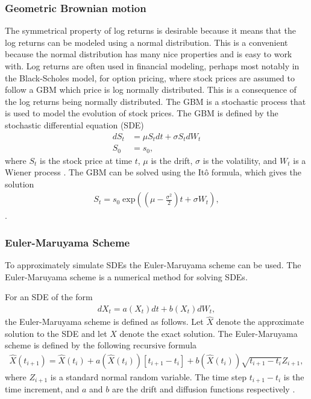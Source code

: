 \subsubsection{Geometric Brownian motion}
The symmetrical property of log returns is desirable because it means that the log returns can be modeled using a normal distribution. This is a convenient because the normal distribution has many nice properties and is easy to work with. Log returns are often used in financial modeling, perhaps most notably in the Black-Scholes model, for option pricing, where stock prices are assumed to follow a \gls{GBM} which price is log normally distributed. This is a consequence of the log returns being normally distributed. The \gls{GBM} is a stochastic process that is used to model the evolution of stock prices. The \gls{GBM} is defined by the stochastic differential equation (SDE)
\begin{align*}
    dS_t &= \mu S_t dt + \sigma S_t dW_t \\
    S_0 &= s_0, 
\end{align*}
where $S_t$ is the stock price at time $t$, $\mu$ is the drift, $\sigma$ is the volatility, and $W_t$ is a Wiener process  . The \gls{GBM} can be solved using the Itô formula, which gives the solution
\begin{align*}
    S_t = s_0 \;\mathrm{exp}\left( \left( \mu - \frac{\sigma^2}{2} \right)t + \sigma W_t \right),
\end{align*}
.

\subsubsection{Euler-Maruyama Scheme}\label{sec:EulerMaruyama}
To approximately simulate \gls{SDE}s the Euler-Maruyama scheme can be used. The Euler-Maruyama scheme is a numerical method for solving \gls{SDE}s. 

For an \gls{SDE} of the form
\begin{align*}
    dX_t = a(X_t)dt + b(X_t)dW_t,
\end{align*}
the Euler-Maruyama scheme is defined as follows. 
Let $\hat{X}$ denote the approximate solution to the \gls{SDE} and let $X$ denote the exact solution. The Euler-Maruyama scheme is defined by the following recursive formula 
\begin{align*}
    \hat{X}(t_{i+1}) = \hat{X}(t_i) + a(\hat{X}(t_i))[t_{i+1}-t_i]  + b(\hat{X}(t_i)) \sqrt{t_{i+1}-t_i} Z_{i+1},
\end{align*}
where $Z_{i+1}$ is a standard normal random variable. The time step $t_{i+1}-t_i$ is the time increment, and $a$ and $b$ are the drift and diffusion functions respectively .

